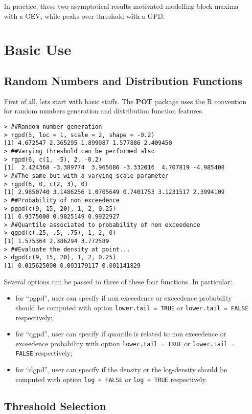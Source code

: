 \documentclass[11pt,a4paper]{article}
\numberwithin{equation}{section}
\begin{document}
In practice, these two asymptotical results motivated modelling block
maxima with a GEV, while peaks over threshold with a GPD.

\section{Basic Use}
\label{sec:BasicUse}

\subsection{Random Numbers and Distribution Functions}
\label{subsec:randDist}

First of all, lets start with basic stuffs. The \textbf{POT} package
uses the R convention for random numbers generation and distribution
function features. 
\begin{verbatim}
> ##Random number generation
> rgpd(5, loc = 1, scale = 2, shape = -0.2)
[1] 4.672547 2.365295 1.899087 1.577886 2.409450
> ##Varying threshold can be performed also
> rgpd(6, c(1, -5), 2, -0.2)
[1]  2.424368 -3.389774  3.965086 -3.332016  4.707819 -4.985408
> ##The same but with a varying scale parameter
> rgpd(6, 0, c(2, 3), 0)
[1] 2.9850740 3.1486256 1.0705649 0.7401753 3.1231517 2.3994109
> ##Probability of non exceedence
> pgpd(c(9, 15, 20), 1, 2, 0.25)
[1] 0.9375000 0.9825149 0.9922927
> ##Quantile associated to probability of non exceedence
> qgpd(c(.25, .5, .75), 1, 2, 0)
[1] 1.575364 2.386294 3.772589
> ##Evaluate the density at point...
> dgpd(c(9, 15, 20), 1, 2, 0.25)
[1] 0.015625000 0.003179117 0.001141829
\end{verbatim}
Several options can be passed to three of these four functions. In
particular:
\begin{itemize}
\item for ``pgpd'', user can specify if non exceedence or exceedence
  probability should be computed with option \verb+lower.tail = TRUE+
  or  \verb+lower.tail = FALSE+ respectively;
\item for ``qgpd'', user can specify if quantile is related to non
  exceedence or exceedence probability with option
  \verb+lower.tail = TRUE+ or \verb+lower.tail = FALSE+ respectively;
\item for ``dgpd'', user can specify if the density or the log-density
  should be computed with option \verb+log = FALSE+ or
  \verb+log = TRUE+ respectively.
\end{itemize}

\subsection{Threshold Selection}
\label{subsec:threshSelect}
\end{document}
